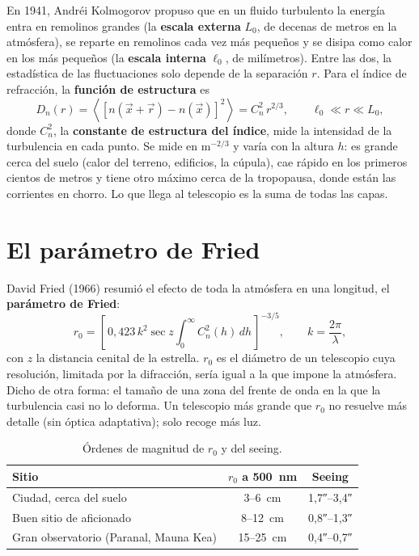 En 1941, Andréi Kolmogorov propuso que en un fluido turbulento la energía entra en remolinos grandes (la \textbf{escala
externa} $L_0$, de decenas de metros en la atmósfera), se reparte en remolinos cada vez más pequeños y se disipa como calor
en los más pequeños (la \textbf{escala interna} $\ell_0$, de milímetros). Entre las dos, la estadística de las
fluctuaciones solo depende de la separación $r$. Para el índice de refracción, la \textbf{función de estructura} es
\begin{equation}
D_n(r) = \left\langle \left[n(\vec x + \vec r) - n(\vec x)\right]^2\right\rangle = C_n^2\, r^{2/3},
\qquad \ell_0 \ll r \ll L_0 ,
\end{equation}
donde $C_n^2$, la \textbf{constante de estructura del índice}, mide la intensidad de la turbulencia en cada punto. Se
mide en m$^{-2/3}$ y varía con la altura $h$: es grande cerca del suelo (calor del terreno, edificios, la cúpula), cae
rápido en los primeros cientos de metros y tiene otro máximo cerca de la tropopausa, donde están las corrientes en chorro.
Lo que llega al telescopio es la suma de todas las capas.

\section{El parámetro de Fried}

David Fried (1966) resumió el efecto de toda la atmósfera en una longitud, el \textbf{parámetro de Fried}:
\begin{equation}
r_0 = \left[\,0{,}423\,k^2 \sec z \int_0^\infty C_n^2(h)\,dh\,\right]^{-3/5},\qquad k = \frac{2\pi}{\lambda},
\label{eq:r0}
\end{equation}
con $z$ la distancia cenital de la estrella. $r_0$ es el diámetro de un telescopio cuya resolución, limitada por la
difracción, sería igual a la que impone la atmósfera. Dicho de otra forma: el tamaño de una zona del frente de onda en la
que la turbulencia casi no lo deforma. Un telescopio más grande que $r_0$ no resuelve más detalle (sin óptica adaptativa);
solo recoge más luz.

\begin{table}[H]
\centering\small
\begin{tabular}{@{}l c c@{}}
\toprule
Sitio & $r_0$ a 500~nm & Seeing\\
\midrule
Ciudad, cerca del suelo & 3–6~cm & 1,7″–3,4″\\
Buen sitio de aficionado & 8–12~cm & 0,8″–1,3″\\
Gran observatorio (Paranal, Mauna Kea) & 15–25~cm & 0,4″–0,7″\\
\bottomrule
\end{tabular}
\caption{Órdenes de magnitud de $r_0$ y del seeing.}
\end{table}

